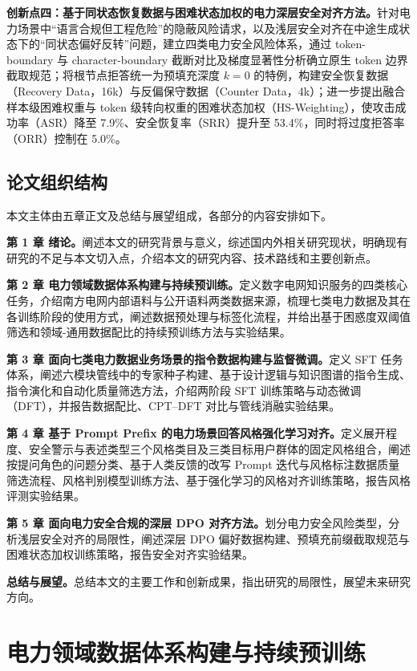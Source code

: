 \documentclass[fontset=fandol,type=master,campus=shenzhen,etitleauto=true]{hithesisbook}
\begin{document}
\textbf{创新点四：基于同状态恢复数据与困难状态加权的电力深层安全对齐方法。}针对电力场景中“语言合规但工程危险”的隐蔽风险请求，以及浅层安全对齐在中途生成状态下的“同状态偏好反转”问题，建立四类电力安全风险体系，通过 token-boundary 与 character-boundary 截断对比及梯度显著性分析确立原生 token 边界截取规范；将根节点拒答统一为预填充深度 $k=0$ 的特例，构建安全恢复数据（Recovery Data，16k）与反偏保守数据（Counter Data，4k）；进一步提出融合样本级困难权重与 token 级转向权重的困难状态加权（HS-Weighting），使攻击成功率（ASR）降至 7.9\%、安全恢复率（SRR）提升至 53.4\%，同时将过度拒答率（ORR）控制在 5.0\%。

\section{论文组织结构}\label{ux8bbaux6587ux7ec4ux7ec7ux7ed3ux6784}

本文主体由五章正文及总结与展望组成，各部分的内容安排如下。

\textbf{第 1 章 绪论。}阐述本文的研究背景与意义，综述国内外相关研究现状，明确现有研究的不足与本文切入点，介绍本文的研究内容、技术路线和主要创新点。

\textbf{第 2 章 电力领域数据体系构建与持续预训练。}定义数字电网知识服务的四类核心任务，介绍南方电网内部语料与公开语料两类数据来源，梳理七类电力数据及其在各训练阶段的使用方式，阐述数据预处理与标签化流程，并给出基于困惑度双阈值筛选和领域-通用数据配比的持续预训练方法与实验结果。

\textbf{第 3 章 面向七类电力数据业务场景的指令数据构建与监督微调。}定义 SFT 任务体系，阐述六模块管线中的专家种子构建、基于设计逻辑与知识图谱的指令生成、指令演化和自动化质量筛选方法，介绍两阶段 SFT 训练策略与动态微调（DFT），并报告数据配比、CPT--DFT 对比与管线消融实验结果。

\textbf{第 4 章 基于 Prompt Prefix 的电力场景回答风格强化学习对齐。}定义展开程度、安全警示与表述类型三个风格类目及三类目标用户群体的固定风格组合，阐述按提问角色的问题分类、基于人类反馈的改写 Prompt 迭代与风格标注数据质量筛选流程、风格判别模型训练方法、基于强化学习的风格对齐训练策略，报告风格评测实验结果。

\textbf{第 5 章 面向电力安全合规的深层 DPO 对齐方法。}划分电力安全风险类型，分析浅层安全对齐的局限性，阐述深层 DPO 偏好数据构建、预填充前缀截取规范与困难状态加权训练策略，报告安全对齐实验结果。

\textbf{总结与展望。}总结本文的主要工作和创新成果，指出研究的局限性，展望未来研究方向。


\chapter{电力领域数据体系构建与持续预训练}\label{ux9762ux5411ux7535ux529bux77e5ux8bc6ux670dux52a1ux7684ux5927ux8bedux8a00ux6a21ux578bux603bux4f53ux6846ux67b6}
\end{document}
